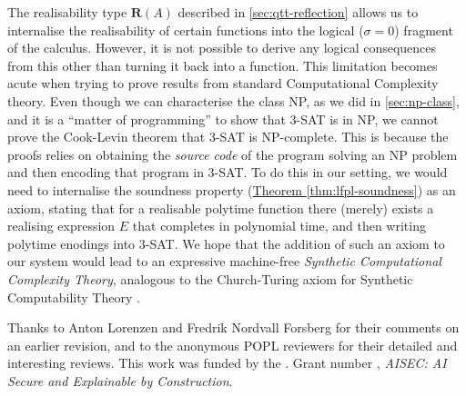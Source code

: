 \documentclass[acmsmall,screen]{acmart}
\newcommand{\thmref}[1]{\hyperref[#1]{Theorem \ref*{#1}}}
\begin{document}
The realisability type $\mathbf{R}(A)$ described in
\autoref{sec:qtt-reflection} allows us to internalise the
realisability of certain functions into the logical ($\sigma = 0$)
fragment of the calculus. However, it is not possible to derive any
logical consequences from this other than turning it back into a
function. This limitation becomes acute when trying to prove results
from standard Computational Complexity theory. Even though we can
characterise the class NP, as we did in \autoref{sec:np-class}, and it
is a ``matter of programming'' to show that 3-SAT is in NP, we cannot
prove the Cook-Levin theorem that 3-SAT is NP-complete. This is
because the proofs relies on obtaining the \emph{source code} of the
program solving an NP problem and then encoding that program in
3-SAT. To do this in our setting, we would need to internalise the
soundness property (\thmref{thm:lfpl-soundness}) as an axiom, stating
that for a realisable polytime function there (merely) exists a
realising expression $E$ that completes in polynomial time, and then
writing polytime enodings into 3-SAT. We hope that the addition of
such an axiom to our system would lead to an expressive machine-free
\emph{Synthetic Computational Complexity Theory}, analogous to the
Church-Turing axiom for Synthetic Computability Theory \cite{Bauer06}.

\begin{acks}
  Thanks to Anton Lorenzen and Fredrik Nordvall Forsberg for their
  comments on an earlier revision, and to the anonymous POPL reviewers
  for their detailed and interesting reviews. This work was funded by
  the . Grant number
  , \emph{AISEC: AI Secure and
    Explainable by Construction}.
\end{acks}



\end{document}
